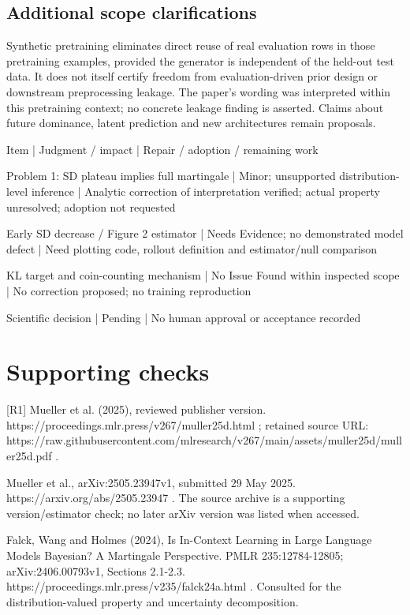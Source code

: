 \documentclass[10pt]{article}
\begin{document}
\subsection*{Additional scope clarifications}
Synthetic pretraining eliminates direct reuse of real evaluation rows in those pretraining examples, provided the generator is independent of the held-out test data. It does not itself certify freedom from evaluation-driven prior design or downstream preprocessing leakage. The paper’s wording was interpreted within this pretraining context; no concrete leakage finding is asserted. Claims about future dominance, latent prediction and new architectures remain proposals.\par
Item | Judgment / impact | Repair / adoption / remaining work\par
Problem 1: SD plateau implies full martingale | Minor; unsupported distribution-level inference | Analytic correction of interpretation verified; actual property unresolved; adoption not requested\par
Early SD decrease / Figure 2 estimator | Needs Evidence; no demonstrated model defect | Need plotting code, rollout definition and estimator/null comparison\par
KL target and coin-counting mechanism | No Issue Found within inspected scope | No correction proposed; no training reproduction\par
Scientific decision | Pending | No human approval or acceptance recorded\par
\section*{Supporting checks}
[R1] Mueller et al. (2025), reviewed publisher version. https://proceedings.mlr.press/v267/muller25d.html ; retained source URL: https://raw.githubusercontent.com/mlresearch/v267/main/assets/muller25d/muller25d.pdf .\par
[R2] Mueller et al., arXiv:2505.23947v1, submitted 29 May 2025. https://arxiv.org/abs/2505.23947 . The source archive is a supporting version/estimator check; no later arXiv version was listed when accessed.\par
[R3] Falck, Wang and Holmes (2024), Is In-Context Learning in Large Language Models Bayesian? A Martingale Perspective. PMLR 235:12784-12805; arXiv:2406.00793v1, Sections 2.1-2.3. https://proceedings.mlr.press/v235/falck24a.html . Consulted for the distribution-valued property and uncertainty decomposition.\par
\end{document}

